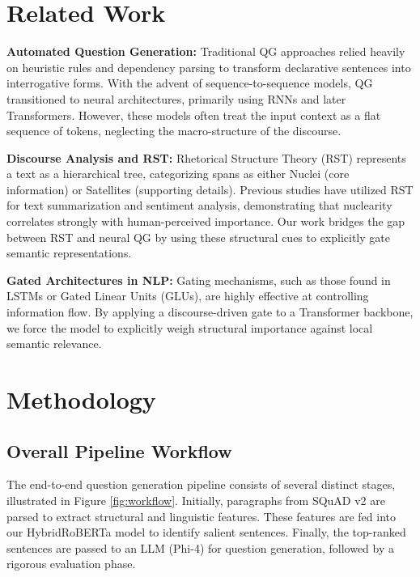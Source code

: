 \documentclass[11pt,a4paper]{article}
\begin{document}
\section{Related Work}

\textbf{Automated Question Generation:} Traditional QG approaches relied heavily on heuristic rules and dependency parsing to transform declarative sentences into interrogative forms. With the advent of sequence-to-sequence models, QG transitioned to neural architectures, primarily using RNNs and later Transformers. However, these models often treat the input context as a flat sequence of tokens, neglecting the macro-structure of the discourse.

\textbf{Discourse Analysis and RST:} Rhetorical Structure Theory (RST) represents a text as a hierarchical tree, categorizing spans as either Nuclei (core information) or Satellites (supporting details). Previous studies have utilized RST for text summarization and sentiment analysis, demonstrating that nuclearity correlates strongly with human-perceived importance. Our work bridges the gap between RST and neural QG by using these structural cues to explicitly gate semantic representations.

\textbf{Gated Architectures in NLP:} Gating mechanisms, such as those found in LSTMs or Gated Linear Units (GLUs), are highly effective at controlling information flow. By applying a discourse-driven gate to a Transformer backbone, we force the model to explicitly weigh structural importance against local semantic relevance.

\section{Methodology}

\subsection{Overall Pipeline Workflow}
The end-to-end question generation pipeline consists of several distinct stages, illustrated in Figure \ref{fig:workflow}. Initially, paragraphs from SQuAD v2 are parsed to extract structural and linguistic features. These features are fed into our HybridRoBERTa model to identify salient sentences. Finally, the top-ranked sentences are passed to an LLM (Phi-4) for question generation, followed by a rigorous evaluation phase.
\end{document}
